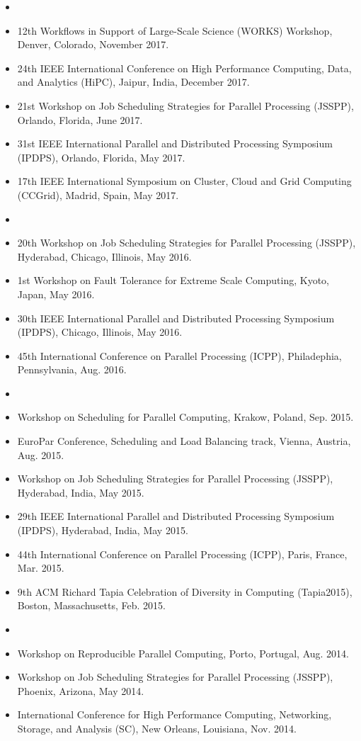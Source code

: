 \documentclass[times,11pt]{letter}
\begin{document}
\begin{itemize}
\item [2017]
\item[--]  12th Workflows in Support of Large-Scale Science (WORKS) Workshop, Denver, Colorado, November 2017.
\item[--]  24th IEEE International Conference on High Performance Computing, Data, and Analytics (HiPC), Jaipur, India, December 2017.
\item[--]  21st Workshop on Job Scheduling Strategies for Parallel Processing (JSSPP), Orlando, Florida, June 2017.
\item[--]  31st IEEE International Parallel and Distributed Processing Symposium (IPDPS), Orlando, Florida, May 2017.
\item[--]  17th IEEE International Symposium on Cluster, Cloud and Grid Computing (CCGrid), Madrid, Spain, May 2017.

\item [2016]
\item[--]  20th Workshop on Job Scheduling Strategies for Parallel Processing (JSSPP), Hyderabad, Chicago, Illinois, May 2016.
\item[--]  1st Workshop on Fault Tolerance for Extreme Scale Computing, 
Kyoto, Japan, May 2016.
\item[--]  30th IEEE International Parallel and Distributed Processing Symposium (IPDPS), Chicago, Illinois, May 2016.
\item[--] 45th International Conference on Parallel Processing (ICPP),  Philadephia, Pennsylvania, Aug. 2016.

\item [2015]
\item[--]  Workshop on Scheduling for Parallel Computing, Krakow, Poland, Sep. 2015.
\item[--]  EuroPar Conference, Scheduling and Load Balancing track, Vienna, Austria, Aug. 2015.
\item[--]  Workshop on Job Scheduling Strategies for Parallel Processing (JSSPP), Hyderabad, India, May 2015.
\item[--]  29th IEEE International Parallel and Distributed Processing Symposium (IPDPS), Hyderabad, India, May 2015.
\item[--] 44th International Conference on Parallel Processing (ICPP),  Paris, France, Mar. 2015.
\item[--]  9th ACM Richard Tapia Celebration of Diversity in Computing (Tapia2015), Boston, Massachusetts, Feb. 2015.

\item [2014]
\item[--]  Workshop on Reproducible Parallel Computing, Porto, Portugal,
Aug. 2014.
\item[--]  Workshop on Job Scheduling Strategies for Parallel Processing (JSSPP), Phoenix, Arizona, May 2014.
\item[--]  International Conference for High Performance Computing, Networking, Storage, and Analysis (SC), New Orleans, Louisiana, Nov. 2014.


\end{itemize}
\end{document}
